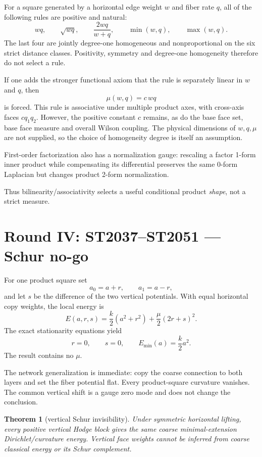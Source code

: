 \documentclass[11pt,a4paper]{article}
\newtheorem{theorem}{Theorem}\newcommand{\status}[1]{\textsf{[#1]}}
\begin{document}
For a square generated by a horizontal edge weight $w$ and fiber rate $q$,
all of the following rules are positive and natural:
\[
wq,\qquad\sqrt{wq},\qquad\frac{2wq}{w+q},\qquad
\min(w,q),\qquad\max(w,q).
\]
The last four are jointly degree-one homogeneous and nonproportional on the six
strict distance classes.  Positivity, symmetry and degree-one homogeneity
therefore do not select a rule.

If one adds the stronger functional axiom that the rule is separately linear
in $w$ and $q$, then
\[
\mu(w,q)=c\,wq
\]
is forced.  This rule is associative under multiple product axes, with
cross-axis faces $c q_1q_2$.  However, the positive constant $c$ remains, as do
the base face set, base face measure and overall Wilson coupling.  The physical
dimensions of $w,q,\mu$ are not supplied, so the choice of homogeneity degree
is itself an assumption.

First-order factorization also has a normalization gauge: rescaling a factor
1-form inner product while compensating its differential preserves the same
0-form Laplacian but changes product 2-form normalization.

Thus bilinearity/associativity selects a useful conditional product
\emph{shape}, not a strict measure.

\section{Round IV: ST2037--ST2051 --- Schur no-go}

For one product square set
\[
a_0=a+r,\qquad a_1=a-r,
\]
and let $s$ be the difference of the two vertical potentials.  With equal
horizontal copy weights, the local energy is
\[
E(a,r,s)=\frac{k}{2}(a^2+r^2)+\frac{\mu}{2}(2r+s)^2.
\]
The exact stationarity equations yield
\[
r=0,\qquad s=0,\qquad
E_{\min}(a)=\frac{k}{2}a^2.
\]
The result contains no $\mu$.

The network generalization is immediate: copy the coarse connection to both
layers and set the fiber potential flat.  Every product-square curvature
vanishes.  The common vertical shift is a gauge zero mode and does not change
the conclusion.

\begin{theorem}[vertical Schur invisibility]
Under symmetric horizontal lifting, every positive vertical Hodge block gives
the same coarse minimal-extension Dirichlet/curvature energy.  Vertical face
weights cannot be inferred from coarse classical energy or its Schur
complement.
\end{theorem}
\end{document}
